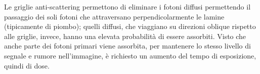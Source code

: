 \documentclass[11pt, a4paper]{scrartcl}
\theoremstyle{style}
\theoremstyle{style1}
\numberwithin{equation}{subsection}
\begin{document}
\noindent Le griglie anti-scattering permettono di eliminare i fotoni diffusi permettendo il passaggio dei soli fotoni che attraversano perpendicolarmente le lamine (tipicamente di piombo); quelli diffusi, che viaggiano su direzioni oblique rispetto alle griglie, invece, hanno una elevata probabilit\`a di essere assorbiti.
Visto che anche parte dei fotoni primari viene assorbita, per mantenere lo stesso livello di segnale e rumore nell'immagine, \`e richiesto un aumento del tempo di esposizione, quindi di dose.
\begin{center}
	\begin{minipage}
		{.45\columnwidth}
		\centering
{}
\end{minipage}
\end{center}
\end{document}
